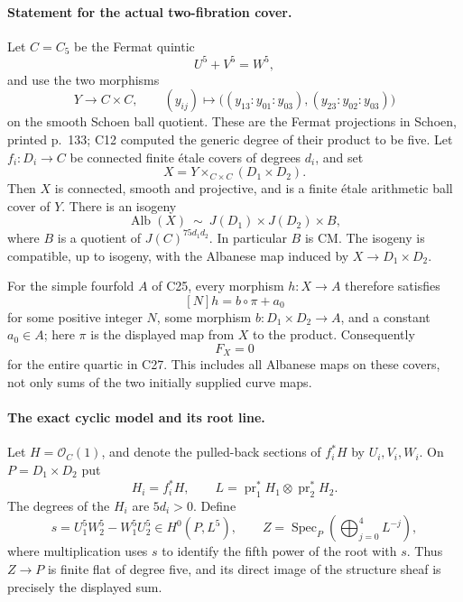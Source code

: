\documentclass[11pt]{article}
\theoremstyle{definition}\newtheorem{definition}[theorem]{Definition}\newtheorem{remark}[theorem]{Remark}
\begin{document}
\paragraph{Statement for the actual two-fibration cover.}
Let $C=C_5$ be the Fermat quintic
\[
                 U^5+V^5=W^5,
\]
and use the two morphisms
\[
 Y\longrightarrow C\times C,\qquad
 (y_{ij})\longmapsto
 \bigl((y_{13}:y_{01}:y_{03}),
       (y_{23}:y_{02}:y_{03})\bigr)
                                                        \tag{C30a}
\]
on the smooth Schoen ball quotient.  These are the
Fermat projections in Schoen, printed p.~133; C12
computed the generic degree of their product to be five.
Let $f_i:D_i\to C$ be connected finite \'etale covers
of degrees $d_i$, and set
\[
               X=Y\times_{C\times C}(D_1\times D_2).
                                                        \tag{C30b}
\]
Then $X$ is connected, smooth and projective, and is a
finite \'etale arithmetic ball cover of $Y$.  There is
an isogeny
\[
 \operatorname{Alb}(X)\ \sim\ J(D_1)\times J(D_2)\times B,
                                                        \tag{C30c}
\]
where $B$ is a quotient of
$J(C)^{75d_1d_2}$.  In particular $B$ is CM.
The isogeny is compatible, up to isogeny, with the
Albanese map induced by $X\to D_1\times D_2$.

For the simple fourfold $A$ of C25, every morphism
$h:X\to A$ therefore satisfies
\[
 [N]h=b\circ\pi+a_0
                                                        \tag{C30d}
\]
for some positive integer $N$, some morphism
$b:D_1\times D_2\to A$, and a constant $a_0\in A$;
here $\pi$ is the displayed map from $X$ to the product.
Consequently
\[
                    F_X=0
                                                        \tag{C30e}
\]
for the entire quartic in C27.  This includes all
Albanese maps on these covers, not only sums of the two
initially supplied curve maps.

\paragraph{The exact cyclic model and its root line.}
Let $H=\mathcal O_C(1)$, and denote the pulled-back
sections of $f_i^*H$ by $U_i,V_i,W_i$.  On
$P=D_1\times D_2$ put
\[
 H_i=f_i^*H,\qquad
 L=\operatorname{pr}_1^*H_1\otimes
                  \operatorname{pr}_2^*H_2.
\]
The degrees of the $H_i$ are $5d_i>0$.  Define
\[
 s=U_1^5W_2^5-W_1^5U_2^5\in H^0(P,L^5),
 \qquad
 Z=\operatorname{Spec}_P
       \left(\bigoplus_{j=0}^4L^{-j}\right),
                                                        \tag{C30f}
\]
where multiplication uses $s$ to identify the fifth
power of the root with $s$.  Thus $Z\to P$ is finite
flat of degree five, and its direct image of the
structure sheaf is precisely the displayed sum.
\end{document}
